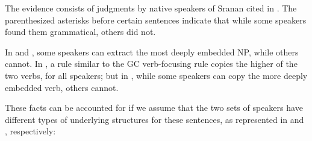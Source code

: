 The evidence consists of judgments by native speakers of Sranan cited in \citet{JansenEtAl1978}. The parenthesized asterisks before certain sentences indicate that while some speakers found them grammatical, others did not.

\z

\z

\z

\z

\z

\z

\label{ex:2:245}\z
In  and , some speakers can extract the most deeply embed\-ded NP, while others cannot. In , a rule similar to the GC verb-focusing rule copies the higher of the two verbs, for all speakers; but in , while some speakers can copy the more deeply embedded verb, others cannot.

These facts can be accounted for if we assume that the two sets of speakers have different types of underlying structures for these sentences, as represented in  and , respectively:


